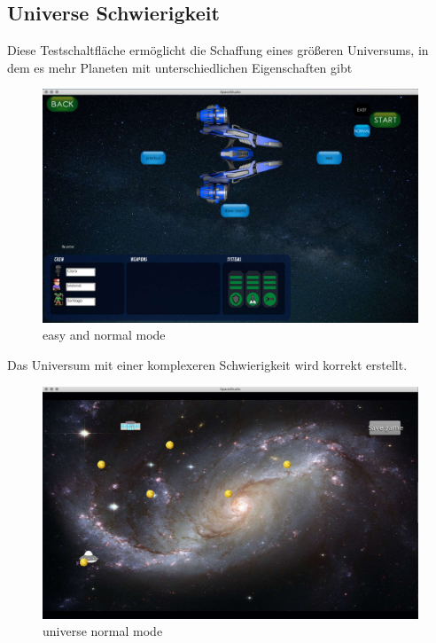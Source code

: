 \documentclass[12pt]{article}
\begin{document}
\newpage
\subsection{Universe Schwierigkeit}

Diese Testschaltfläche ermöglicht die Schaffung eines größeren Universums, in dem es mehr Planeten mit unterschiedlichen Eigenschaften gibt\\
\begin{figure}
\centering
\includegraphics[scale=0.4]{TestProtocolBilder/universeButon.jpg}
\caption{easy and normal mode}
\end{figure}

\newpage
Das Universum mit einer komplexeren Schwierigkeit wird korrekt erstellt.\\

\begin{figure}[t]
\centering
\includegraphics[scale=0.4]{TestProtocolBilder/universeHard.jpg}
\caption{universe normal mode}
\end{figure}
\end{document}
